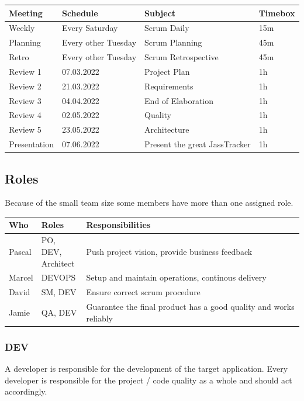 \begin{table}[H]
    \begin{tabular}{l|l|l|l}
    \textbf{Meeting} & \textbf{Schedule} & \textbf{Subject} & \textbf{Timebox} \\
    \hline
    Weekly & Every Saturday & Scrum Daily & 15m \\
    Planning & Every other Tuesday & Scrum Planning & 45m \\
    Retro & Every other Tuesday & Scrum Retrospective & 45m \\
    Review 1 & 07.03.2022 & Project Plan & 1h \\
    Review 2 & 21.03.2022 & Requirements & 1h \\
    Review 3 & 04.04.2022 & End of Elaboration & 1h \\
    Review 4 & 02.05.2022 & Quality & 1h \\
    Review 5 & 23.05.2022 & Architecture & 1h \\
    Presentation & 07.06.2022 & Present the great JassTracker & 1h
    \end{tabular}
\end{table}

\subsection*{Roles}

Because of the small team size some members have more than one assigned role.

\begin{table}[H]
    \begin{tabular}{l|l|l}
    \textbf{Who} & \textbf{Roles} & \textbf{Responsibilities} \\
    \hline
    Pascal & \makecell{PO, DEV, \\ Architect} & Push project vision, provide business feedback \\
    Marcel & DEVOPS & Setup and maintain operations, continous delivery \\
    David  & SM, DEV & Ensure correct scrum procedure \\
    Jamie  & QA, DEV & Guarantee the final product has a good quality and works reliably
    \end{tabular}
\end{table}

\subsubsection*{DEV}
A developer is responsible for the development of the target application.
Every developer is responsible for the project / code quality as a whole and should act accordingly.

